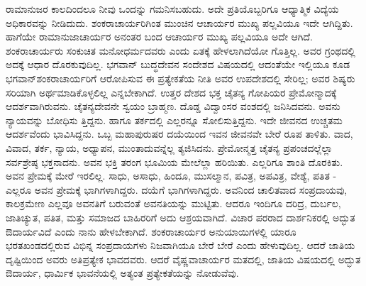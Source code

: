 ರಾಮಾನುಜರ ಕಾಲದಿಂದಲೂ ನೀವು ಒಂದನ್ನು ಗಮನಿಸಬಹುದು. ಅದೇ ಪ್ರತಿಯೊಬ್ಬರಿಗೂ ಆಧ್ಯಾತ್ಮಿಕ ವಿದ್ಯೆಯ ಅಧಿಕಾರವನ್ನು ನೀಡಿದುದು. ಶಂಕರಾಚಾರ್ಯರಿಗಿಂತ ಮುಂಚಿನ ಆಚಾರ್ಯರ ಮುಖ್ಯ ಪಲ್ಲವಿಯೂ ಇದೇ ಆಗಿದ್ದಿತು. ಹಾಗೆಯೇ ರಾಮಾನುಜಾ\-ಚಾರ್ಯರ ಅನಂತರ ಬಂದ ಆಚಾರ್ಯರ ಮುಖ್ಯ ಪಲ್ಲವಿಯೂ ಅದೇ ಆಗಿದೆ. ಶಂಕರಾಚಾರ್ಯರು ಸಂಕುಚಿತ ಮನೋಧರ್ಮದವರು ಎಂದು ಏತಕ್ಕೆ ಹೇಳ\-ಲಾಗಿದೆಯೋ ಗೊತ್ತಿಲ್ಲ. ಅವರ ಗ್ರಂಥದಲ್ಲಿ ಅದಕ್ಕೆ ಆಧಾರ ದೊರಕುವುದಿಲ್ಲ. ಭಗವಾನ್​ ಬುದ್ಧದೇವನ ಸಂದೇಶದ ವಿಷಯದಲ್ಲಿ ಆದಂತೆಯೇ ಇಲ್ಲಿಯೂ ಕೂಡ ಭಗವಾನ್​ ಶಂಕರಾಚಾರ್ಯರಿಗೆ ಆರೋಪಿಸುವ ಈ ಪ್ರತ್ಯೇಕತೆಯ ನೀತಿ ಅವರ ಉಪದೇಶದಲ್ಲಿ ಸೇರಿಲ್ಲ; ಅವರ ಶಿಷ್ಯರು ಸರಿಯಾಗಿ ಅರ್ಥಮಾಡಿಕೊಳ್ಳಲಿಲ್ಲ ಎನ್ನಬೇಕಾಗಿದೆ. ಉತ್ತರ ದೇಶದ ಭಕ್ತ ಚೈತನ್ಯ ಗೋಪಿಯರ ಪ್ರೇಮೋನ್ಮಾದಕ್ಕೆ ಆದರ್ಶವಾಗಿರುವನು. ಚೈತನ್ಯದೇವನೇ ಸ್ವಯಂ ಬ್ರಾಹ್ಮಣ. ದೊಡ್ಡ ವಿದ್ವಾಂಸರ ವಂಶದಲ್ಲಿ ಜನಿಸಿದವನು. ಅವನು ನ್ಯಾಯವನ್ನು ಬೋಧಿಸು\- ತ್ತಿದ್ದನು. ಹಾಗೂ ತರ್ಕದಲ್ಲಿ ಎಲ್ಲರನ್ನೂ ಸೋಲಿಸುತ್ತಿದ್ದನು. ಇದೇ ಜೀವನದ ಉಚ್ಚತಮ ಆದರ್ಶವೆಂದು ಭಾವಿಸಿದ್ದನು. ಒಬ್ಬ ಮಹಾಪುರುಷರ ದಯೆಯಿಂದ ಇವನ ಜೀವನವೇ ಬೇರೆ ರೂಪ ತಾಳಿತು. ವಾದ, ವಿವಾದ, ತರ್ಕ, ನ್ಯಾಯ, ಅಧ್ಯಾಪನ, ಮುಂತಾದುವನ್ನೆಲ್ಲ ತ್ಯಜಿಸಿದನು. ಪ್ರೇಮೋನ್ಮತ್ತ ಚೈತನ್ಯ ಪ್ರಪಂಚದಲ್ಲೆಲ್ಲಾ ಸರ್ವಶ್ರೇಷ್ಠ ಭಕ್ತನಾದನು. ಅವನ ಭಕ್ತಿ ತರಂಗ ಭೂಮಿಯ ಮೇಲೆಲ್ಲಾ ಹರಿಯಿತು. ಎಲ್ಲರಿಗೂ ಶಾಂತಿ ದೊರಕಿತು. ಅವನ ಪ್ರೇಮಕ್ಕೆ ಮೇರೆ ಇರಲಿಲ್ಲ. ಸಾಧು, ಅಸಾಧು, ಹಿಂದೂ, ಮುಸಲ್ಮಾನ, ಪವಿತ್ರ, ಅಪವಿತ್ರ, ವೇಶ್ಯೆ, ಪತಿತ - ಎಲ್ಲರೂ ಅವನ ಪ್ರೇಮಕ್ಕೆ ಭಾಗಿಗಳಾಗಿದ್ದರು. ದಯೆಗೆ ಭಾಗಿಗಳಾಗಿದ್ದರು. ಅವನಿಂದ ಚಾಲಿತವಾದ ಸಂಪ್ರದಾಯವು, ಕಾಲಕ್ರಮೇಣ ಎಲ್ಲವೂ ಅವನತಿಗೆ ಬರುವಂತೆ ಅವನತಿಯನ್ನು ಮುಟ್ಟಿತು. ಆದರೂ ಇಂದಿಗೂ ದರಿದ್ರ, ದುರ್ಬಲ, ಜಾತಿಚ್ಯುತ, ಪತಿತ, ಮತ್ತು ಸಮಾಜದ ಬಾಹಿರರಿಗೆ ಅದು ಆಶ್ರಯವಾಗಿದೆ. ವಿಚಾರ ಪರರಾದ ದಾರ್ಶನಿಕರಲ್ಲಿ ಅದ್ಭುತ ಔದಾರ್ಯವಿದೆ ಎಂದು ನಾನು ಹೇಳಬೇಕಾಗಿದೆ. ಶಂಕರಾಚಾರ್ಯರ ಅನುಯಾಯಿಗಳಲ್ಲಿ ಯಾರೂ ಭರತಖಂಡದಲ್ಲಿರುವ ವಿಭಿನ್ನ ಸಂಪ್ರದಾಯಗಳು ನಿಜವಾಗಿಯೂ ಬೇರೆ ಬೇರೆ ಎಂದು ಹೇಳುವುದಿಲ್ಲ. ಆದರೆ ಜಾತಿಯ ದೃಷ್ಟಿಯಿಂದ ಅವರು ಅತಿಪ್ರತ್ಯೇಕ ಭಾವದವರು. ಆದರೆ ವೈಷ್ಣವಾಚಾರ್ಯರ ಮತದಲ್ಲಿ, ಜಾತಿಯ ವಿಷಯದಲ್ಲಿ ಅದ್ಭುತ ಔದಾರ್ಯ, ಧಾರ್ಮಿಕ ಭಾವನೆಯಲ್ಲಿ ಅತ್ಯಂತ ಪ್ರತ್ಯೇಕತೆಯನ್ನು ನೋಡುವೆವು.

